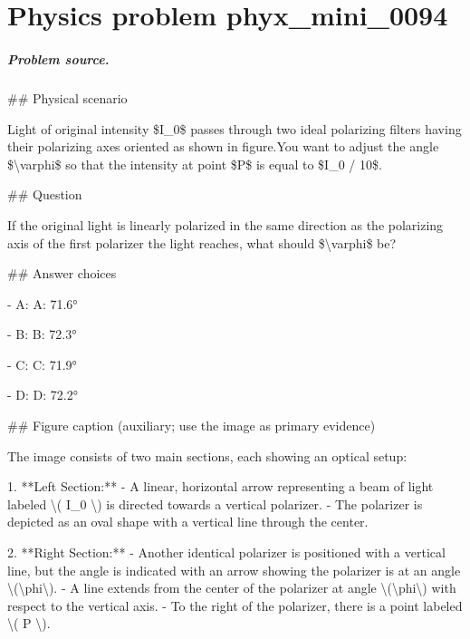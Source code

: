 
\chapter{Physics problem phyx\_mini\_0094}
\label{ch:PhyXMiniProblems_problem_phyx_mini_0094}

\paragraph{Problem source.}
\#\# Physical scenario

Light of original intensity \$I\_0\$ passes through two ideal polarizing filters having their polarizing axes oriented as shown in figure.You want to adjust the angle \$\textbackslash{}varphi\$ so that the intensity at point \$P\$ is equal to \$I\_0 / 10\$.

\#\# Question

If the original light is linearly polarized in the same direction as the polarizing axis of the first polarizer the light reaches, what should \$\textbackslash{}varphi\$ be?

\#\# Answer choices

- A: A: 71.6°

- B: B: 72.3°

- C: C: 71.9°

- D: D: 72.2°

\#\# Figure caption (auxiliary; use the image as primary evidence)

The image consists of two main sections, each showing an optical setup:

1. **Left Section:**
   - A linear, horizontal arrow representing a beam of light labeled \textbackslash{}( I\_0 \textbackslash{}) is directed towards a vertical polarizer.
   - The polarizer is depicted as an oval shape with a vertical line through the center.

2. **Right Section:**
   - Another identical polarizer is positioned with a vertical line, but the angle is indicated with an arrow showing the polarizer is at an angle \textbackslash{}(\textbackslash{}phi\textbackslash{}).
   - A line extends from the center of the polarizer at angle \textbackslash{}(\textbackslash{}phi\textbackslash{}) with respect to the vertical axis.
   - To the right of the polarizer, there is a point labeled \textbackslash{}( P \textbackslash{}).

